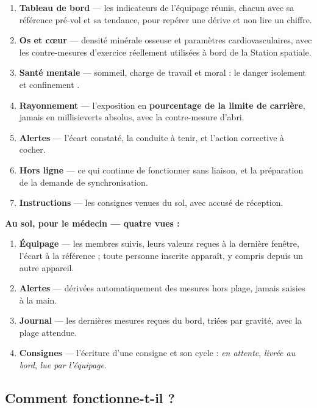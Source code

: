 \documentclass[11pt,a4paper]{article}
\begin{document}
\begin{enumerate}
  \item \textbf{Tableau de bord} --- les indicateurs de l'\'equipage r\'eunis, chacun avec sa
        r\'ef\'erence pr\'e-vol et sa tendance, pour rep\'erer une d\'erive et non lire un chiffre.
  \item \textbf{Os et c\oe{}ur} --- densit\'e min\'erale osseuse et param\`etres cardiovasculaires, avec
        les contre-mesures d'exercice r\'eellement utilis\'ees \`a bord de la Station spatiale.
  \item \textbf{Sant\'e mentale} --- sommeil, charge de travail et moral : le danger
        \og isolement et confinement \fg{}.
  \item \textbf{Rayonnement} --- l'exposition en \textbf{pourcentage de la limite de carri\`ere},
        jamais en millisieverts absolus, avec la contre-mesure d'abri.
  \item \textbf{Alertes} --- l'\'ecart constat\'e, la conduite \`a tenir, et l'action corrective \`a
        cocher.
  \item \textbf{Hors ligne} --- ce qui continue de fonctionner sans liaison, et la pr\'eparation de la
        demande de synchronisation.
  \item \textbf{Instructions} --- les consignes venues du sol, avec accus\'e de r\'eception.
\end{enumerate}

\vspace{0.2cm}
\textbf{Au sol, pour le m\'edecin --- quatre vues :}

\begin{enumerate}
  \item \textbf{\'Equipage} --- les membres suivis, leurs valeurs re\c{c}ues \`a la derni\`ere
        fen\^etre, l'\'ecart \`a la r\'ef\'erence ; toute personne inscrite appara\^it, y compris
        depuis un autre appareil.
  \item \textbf{Alertes} --- d\'eriv\'ees automatiquement des mesures hors plage, jamais saisies \`a
        la main.
  \item \textbf{Journal} --- les derni\`eres mesures re\c{c}ues du bord, tri\'ees par gravit\'e, avec la
        plage attendue.
  \item \textbf{Consignes} --- l'\'ecriture d'une consigne et son cycle : \emph{en attente},
        \emph{livr\'ee au bord}, \emph{lue par l'\'equipage}.
\end{enumerate}

\subsection{Comment fonctionne-t-il ?}
\end{document}
